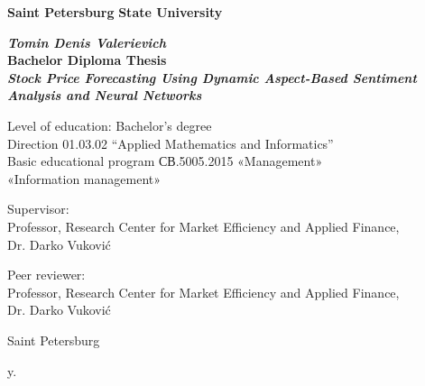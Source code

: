 \begin{titlepage}
\begin{center}

\textbf{Saint Petersburg}
\textbf{State University}

\vspace{35mm}

\textbf{\textit{\large Tomin Denis Valerievich}} \\[8mm]
\textbf{\large Bachelor Diploma Thesis}\\[3mm]
\textbf{\textit{\large Stock Price Forecasting Using Dynamic Aspect-Based Sentiment Analysis and Neural Networks}}

\vspace{20mm}
Level of education: Bachelor's degree\\
Direction 01.03.02 “Applied Mathematics and Informatics”\\
Basic educational program СВ.5005.2015
«Management»\\
«Information management»\\[25mm]


\begin{flushright}
\begin{minipage}[t]{0.65\textwidth}
{Supervisor:} \\
Professor, Research Center for Market Efficiency and Applied Finance, \\ Dr. Darko Vuković

\vspace{10mm}

{Peer reviewer:} \\
Professor, Research Center for Market Efficiency and Applied Finance, \\ Dr. Darko Vuković
\end{minipage}
\end{flushright}

\vfill

{Saint Petersburg}
\par{\the\year{} y.}
\end{center}
\end{titlepage}
\restoregeometry
\addtocounter{page}{1}